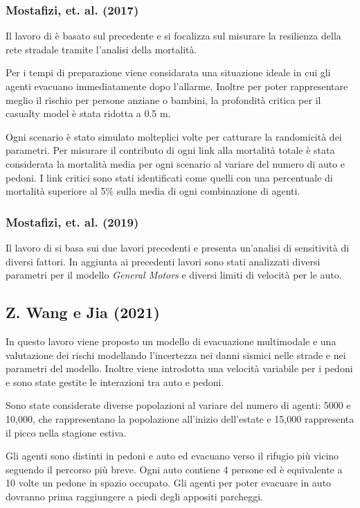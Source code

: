 \subsubsection*{Mostafizi, et. al. (2017)}
Il lavoro di \textcite{mostafizi2017agent} è basato sul precedente \parencite{wang2016agent} e si focalizza sul misurare la resilienza della rete stradale tramite l'analisi della mortalità.

Per i tempi di preparazione viene considarata una situazione ideale in cui gli agenti evacuano immediatamente dopo l'allarme. Inoltre per poter rappresentare
meglio il rischio per persone anziane o bambini, la profondità critica per il casualty model è stata ridotta a 0.5 m.

Ogni scenario è stato simulato molteplici volte per catturare la randomicità dei parametri. 
Per misurare il contributo di ogni link alla mortalità totale è stata considerata la mortalità media per ogni scenario al variare del numero di auto e pedoni.
I link critici sono stati identificati come quelli con una percentuale di mortalità superiore al 5\% sulla media di ogni combinazione di agenti.

\subsubsection*{Mostafizi, et. al. (2019)}
Il lavoro di \textcite{mostafizi2019agent} si basa sui due lavori precedenti e 
presenta un'analisi di sensitività di diversi fattori. 
In aggiunta ai precedenti lavori sono stati analizzati diversi parametri per 
il modello \textit{General Motors} e diversi limiti di velocità per le auto.


\subsection{Z. Wang e Jia (2021)}
In questo lavoro viene proposto un modello di evacuazione multimodale e una valutazione dei rischi modellando l'incertezza
nei danni sismici nelle strade e nei parametri del modello. Inoltre viene introdotta una velocità variabile per i pedoni e sono state 
gestite le interazioni tra auto e pedoni.

Sono state considerate diverse popolazioni al variare del numero di agenti: 5000 e 10,000,
che rappresentano la popolazione all'inizio dell'estate e 15,000 rappresenta il picco nella stagione estiva.

Gli agenti sono distinti in pedoni e auto ed evacuano verso il rifugio più vicino seguendo il percorso più breve.
Ogni auto contiene 4 persone ed è equivalente a 10 volte un pedone in spazio occupato.
Gli agenti per poter evacuare in auto dovranno prima raggiungere a piedi degli appositi parcheggi.


